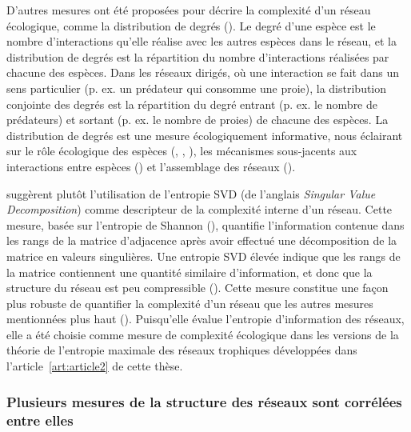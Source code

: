 D'autres mesures ont été proposées pour décrire la complexité d'un réseau
écologique, comme la distribution de degrés (\cite{Landi2018Complexity}). Le
degré d'une espèce est le nombre d'interactions qu'elle réalise avec les autres
espèces dans le réseau, et la distribution de degrés est la répartition du
nombre d'interactions réalisées par chacune des espèces. Dans les réseaux
dirigés, où une interaction se fait dans un sens particulier (p. ex. un
prédateur qui consomme une proie), la distribution conjointe des degrés est la
répartition du degré entrant (p. ex. le nombre de prédateurs) et sortant (p. ex.
le nombre de proies) de chacune des espèces. La distribution de degrés est une
mesure écologiquement informative, nous éclairant sur le rôle écologique des
espèces (\cite{Sole2001Complexity}, \cite{Dunne2002Network},
\cite{Memmott2004Tolerance}), les mécanismes sous-jacents aux interactions entre
espèces (\cite{Williams2011Biology}) et l'assemblage des réseaux
(\cite{Vazquez2005Degree}). 

\textcite{Strydom2021Svd} suggèrent plutôt l'utilisation de l'entropie SVD (de
l'anglais \textit{Singular Value Decomposition}) comme descripteur de la
complexité interne d'un réseau. Cette mesure, basée sur l'entropie de Shannon
(\cite{Shannon1948Mathematical}), quantifie l'information contenue dans les
rangs de la matrice d'adjacence après avoir effectué une décomposition de la
matrice en valeurs singulières. Une entropie SVD élevée indique que les rangs de
la matrice contiennent une quantité similaire d'information, et donc que la
structure du réseau est peu compressible (\cite{Gu2016How}). Cette mesure
constitue une façon plus robuste de quantifier la complexité d'un réseau que les
autres mesures mentionnées plus haut (\cite{Strydom2021Svd}). Puisqu'elle évalue
l'entropie d'information des réseaux, elle a été choisie comme mesure de
complexité écologique dans les versions de la théorie de l'entropie maximale des
réseaux trophiques développées dans l'article~\ref{art:article2} de cette thèse. 

\subsubsection{Plusieurs mesures de la structure des réseaux sont corrélées entre elles} 

